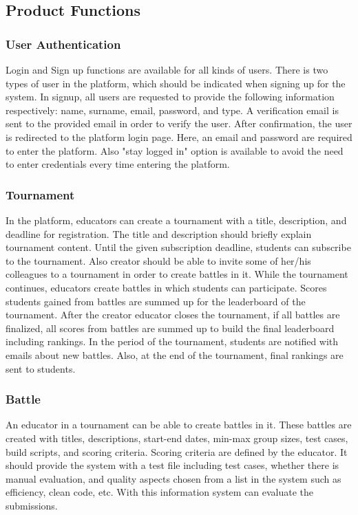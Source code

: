 \subsection{Product Functions}
\subsubsection{User Authentication}
Login and Sign up functions are available for all kinds of users. There is two types of user in the platform, which should be indicated when signing up for the system. In signup, all users are requested to provide the following information respectively:
name, surname, email, password, and type. A verification email is sent to the provided email in order to verify the user. After confirmation, the user is redirected to the platform login page. Here, an email and password are required to enter the platform. Also "stay logged in" option is available to avoid the need to enter credentials every time entering the platform.
\subsubsection{Tournament}
In the platform, educators can create a tournament with a title, description, and deadline for registration.  The title and description should briefly explain tournament content. Until the given subscription deadline, students can subscribe to the tournament. Also creator should be able to invite some of her/his colleagues to a tournament in order to create battles in it. While the tournament continues, educators create battles in which students can participate. Scores students gained from battles are summed up for the leaderboard of the tournament. After the creator educator closes the tournament, if all battles are finalized, all scores from battles are summed up to build the final leaderboard including rankings. In the period of the tournament, students are notified with emails about new battles. Also, at the end of the tournament, final rankings are sent to students.
\subsubsection{Battle}
An educator in a tournament can be able to create battles in it. These battles are created with titles, descriptions, start-end dates, min-max group sizes, test cases, build scripts, and scoring criteria. Scoring criteria are defined by the educator. It should provide the system with a test file including test cases, whether there is manual evaluation, and quality aspects chosen from a list in the system such as efficiency, clean code, etc. With this information system can evaluate the submissions.


